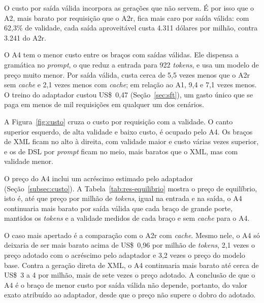 O custo por saída válida incorpora as gerações que não servem. É por isso que o A2, mais barato por requisição que o A2r, fica mais caro por saída válida: com 62,3\% de validade, cada saída aproveitável custa 4.311 dólares por milhão, contra 3.241 do A2r.

O A4 tem o menor custo entre os braços com saídas válidas. Ele dispensa a gramática no \textit{prompt}, o que reduz a entrada para 922 \textit{tokens}, e usa um modelo de preço muito menor. Por saída válida, custa cerca de 5,5 vezes menos que o A2r sem \textit{cache} e 2,1 vezes menos com \textit{cache}; em relação ao A1, 9,4 e 7,1 vezes menos. O treino do adaptador custou US\$~0,47 (Seção~\ref{sec:sft}), um gasto único que se paga em menos de mil requisições em qualquer um dos cenários.

A Figura~\ref{fig:custo} cruza o custo por requisição com a validade. O canto superior esquerdo, de alta validade e baixo custo, é ocupado pelo A4. Os braços de XML ficam no alto à direita, com validade maior e custo várias vezes superior, e os de DSL por \textit{prompt} ficam no meio, mais baratos que o XML, mas com validade menor.



O preço do A4 inclui um acréscimo estimado pelo adaptador (Seção~\ref{subsec:custo}). A Tabela~\ref{tab:res-equilibrio} mostra o preço de equilíbrio, isto é, até que preço por milhão de \textit{tokens}, igual na entrada e na saída, o A4 continuaria mais barato por saída válida que cada braço de grande porte, mantidos os \textit{tokens} e a validade medidos de cada braço e sem \textit{cache} para o A4.

\begin{table}[htb]
\end{table}

O caso mais apertado é a comparação com o A2r com \textit{cache}. Mesmo nele, o A4 só deixaria de ser mais barato acima de US\$~0,96 por milhão de \textit{tokens}, 2,1 vezes o preço adotado com o acréscimo pelo adaptador e 3,2 vezes o preço do modelo base. Contra a geração direta de XML, o A4 continuaria mais barato até cerca de US\$~3 a 4 por milhão, mais de sete vezes o preço adotado. A conclusão de que o A4 é o braço de menor custo por saída válida não depende, portanto, do valor exato atribuído ao adaptador, desde que o preço não supere o dobro do adotado.


